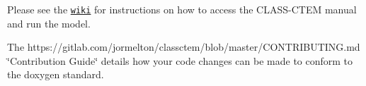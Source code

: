 Please see the \href{https://gitlab.com/jormelton/classctem/wikis/home}{\tt wiki} for instructions on how to access the C\+L\+A\+S\+S-\/\+C\+T\+E\+M manual and run the model.

The https\+://gitlab.com/jormelton/classctem/blob/master/\+C\+O\+N\+T\+R\+I\+B\+U\+T\+I\+N\+G.\+md \char`\"{}\+Contribution Guide\char`\"{} details how your code changes can be made to conform to the doxygen standard. 